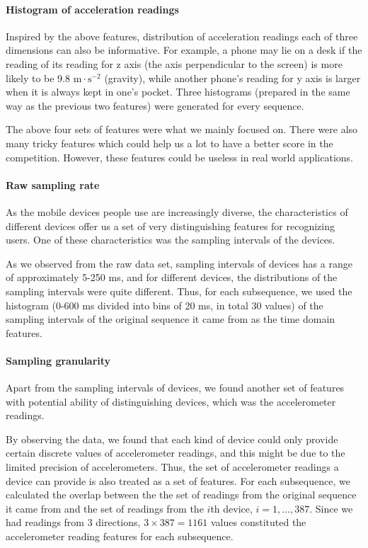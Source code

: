 \documentclass{article} %
\begin{document}
\paragraph{Histogram of acceleration readings}
Inspired by the above features, distribution of acceleration readings each of three dimensions can also be informative. For example, a phone may lie on a desk if the reading of its reading for z axis (the axis perpendicular to the screen) is more likely to be 9.8 $\mathrm{m}\cdot \mathrm{s}^{-2}$ (gravity), while another phone's reading for y axis is larger when it is always kept in one's pocket. Three histograms (prepared in the same way as the previous two features) were generated for every sequence.

The above four sets of features were what we mainly focused on. There were also many tricky features which could help us a lot to have a better score in the competition. However, these features could be useless in real world applications. 

\paragraph{Raw sampling rate}
As the mobile devices people use are increasingly diverse, the characteristics of different devices offer us a set of very distinguishing features for recognizing users. One of these characteristics was the sampling intervals of the devices.

As we observed from the raw data set, sampling intervals of devices has a range of approximately 5-250 ms, and for different devices, the distributions of the sampling intervals were quite different. Thus, for each subsequence, we used the histogram (0-600 ms divided into bins of 20 ms, in total 30 values) of the sampling intervals of the original sequence it came from as the time domain features. 

\paragraph{Sampling granularity}
Apart from the sampling intervals of devices, we found another set of features with potential ability of distinguishing devices, which was the accelerometer readings.

By observing the data, we found that each kind of device could only provide certain discrete values of accelerometer readings, and this might be due to the limited precision of accelerometers. Thus, the set of accelerometer readings a device can provide is also treated as a set of features. For each subsequence, we calculated the overlap between the the set of readings from the original sequence it came from and the set of readings from the $i$th device, $i=1,\ldots,387$. Since we had readings from 3 directions, $3\times 387 = 1161$ values constituted the accelerometer reading features for each subsequence.
\end{document}
